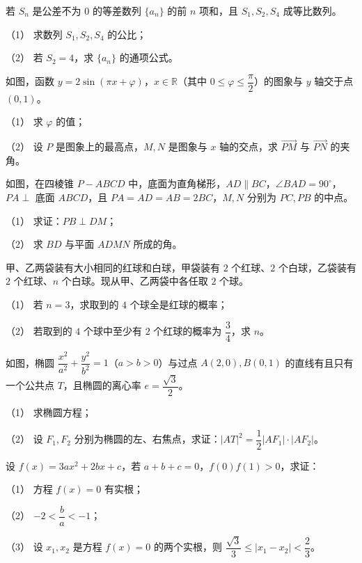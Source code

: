 \begin{question}
若 $S_n$ 是公差不为 $0$ 的等差数列 $\{a_n\}$ 的前 $n$ 项和，且 $S_1,S_2,S_4$ 成等比数列。

（1） 求数列 $S_1,S_2,S_4$ 的公比；

（2） 若 $S_2=4$，求 $\{a_n\}$ 的通项公式。

\Needspace{0.4\textheight}
\end{question}
\begin{question}
如图，函数 $y=2\sin(\pi x+\varphi)$，$x\in\mathbb R$（其中 $0\leqslant\varphi\leqslant\dfrac\pi2$）的图象与 $y$ 轴交于点 $(0,1)$。

（1） 求 $\varphi$ 的值；

（2） 设 $P$ 是图象上的最高点，$M,N$ 是图象与 $x$ 轴的交点，求 $\overrightarrow{PM}$ 与 $\overrightarrow{PN}$ 的夹角。
\nopagebreak[4]
\begin{center}\end{center}
\nopagebreak[4]
\Needspace{0.4\textheight}
\end{question}
\begin{question}
如图，在四棱锥 $P-ABCD$ 中，底面为直角梯形，$AD\parallel BC$，$\angle BAD=90^\circ$，$PA\perp$ 底面 $ABCD$，且 $PA=AD=AB=2BC$，$M,N$ 分别为 $PC,PB$ 的中点。

（1） 求证：$PB\perp DM$；

（2） 求 $BD$ 与平面 $ADMN$ 所成的角。
\nopagebreak[4]
\begin{center}\end{center}
\nopagebreak[4]
\end{question}
\begin{question}
甲、乙两袋装有大小相同的红球和白球，甲袋装有 $2$ 个红球、$2$ 个白球，乙袋装有 $2$ 个红球、$n$ 个白球。现从甲、乙两袋中各任取 $2$ 个球。

（1） 若 $n=3$，求取到的 $4$ 个球全是红球的概率；

（2） 若取到的 $4$ 个球中至少有 $2$ 个红球的概率为 $\dfrac34$，求 $n$。

\Needspace{0.4\textheight}
\end{question}
\begin{question}
如图，椭圆 $\dfrac{x^2}{a^2}+\dfrac{y^2}{b^2}=1$（$a>b>0$）与过点 $A(2,0),B(0,1)$ 的直线有且只有一个公共点 $T$，且椭圆的离心率 $e=\dfrac{\sqrt3}{2}$。

（1） 求椭圆方程；

（2） 设 $F_1,F_2$ 分别为椭圆的左、右焦点，求证：$|AT|^2=\dfrac12|AF_1|\cdot|AF_2|$。
\nopagebreak[4]
\begin{center}\end{center}
\nopagebreak[4]
\end{question}
\begin{question}
设 $f(x)=3ax^2+2bx+c$，若 $a+b+c=0$，$f(0)f(1)>0$，求证：

（1） 方程 $f(x)=0$ 有实根；

（2） $-2<\dfrac ba<-1$；

（3） 设 $x_1,x_2$ 是方程 $f(x)=0$ 的两个实根，则 $\dfrac{\sqrt3}{3}\leqslant|x_1-x_2|<\dfrac23$。

\end{question}